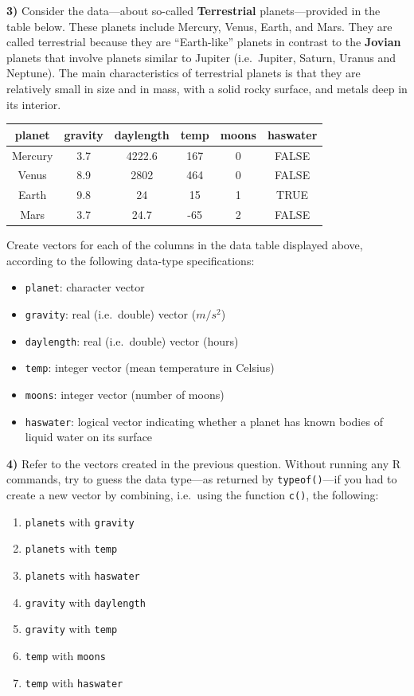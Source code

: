 \documentclass[
]{book}
\begin{document}
\textbf{3)} Consider the data---about so-called \textbf{Terrestrial} planets---provided
in the table below. These planets include Mercury, Venus, Earth, and Mars. They
are called terrestrial because they are ``Earth-like'' planets in contrast to the
\textbf{Jovian} planets that involve planets similar to Jupiter (i.e.~Jupiter,
Saturn, Uranus and Neptune). The main characteristics of terrestrial planets is that they are relatively small in size and in mass, with a solid rocky surface,
and metals deep in its interior.

\begin{longtable}[]{@{}cccccc@{}}
\toprule()
planet & gravity & daylength & temp & moons & haswater \\
\midrule()
\endhead
Mercury & 3.7 & 4222.6 & 167 & 0 & FALSE \\
Venus & 8.9 & 2802 & 464 & 0 & FALSE \\
Earth & 9.8 & 24 & 15 & 1 & TRUE \\
Mars & 3.7 & 24.7 & -65 & 2 & FALSE \\
\bottomrule()
\end{longtable}

Create vectors for each of the columns in the data table displayed above,
according to the following data-type specifications:

\begin{itemize}
\item
  \texttt{planet}: character vector
\item
  \texttt{gravity}: real (i.e.~double) vector (\(m/s^2\))
\item
  \texttt{daylength}: real (i.e.~double) vector (hours)
\item
  \texttt{temp}: integer vector (mean temperature in Celsius)
\item
  \texttt{moons}: integer vector (number of moons)
\item
  \texttt{haswater}: logical vector indicating whether a planet has known bodies of
  liquid water on its surface
\end{itemize}

\textbf{4)} Refer to the vectors created in the previous question. Without running
any R commands, try to guess the data type---as returned by \texttt{typeof()}---if you
had to create a new vector by combining, i.e.~using the function \texttt{c()}, the
following:

\begin{enumerate}
\def\labelenumi{\alph{enumi})}
\item
  \texttt{planets} with \texttt{gravity}
\item
  \texttt{planets} with \texttt{temp}
\item
  \texttt{planets} with \texttt{haswater}
\item
  \texttt{gravity} with \texttt{daylength}
\item
  \texttt{gravity} with \texttt{temp}
\item
  \texttt{temp} with \texttt{moons}
\item
  \texttt{temp} with \texttt{haswater}
\end{enumerate}
\end{document}
